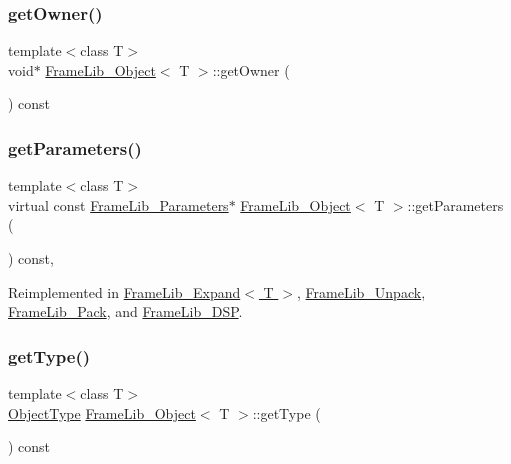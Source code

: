 \subsubsection{\texorpdfstring{get\+Owner()}{getOwner()}}
{\footnotesize\ttfamily template$<$class T$>$ \\
void$\ast$ \hyperlink{class_frame_lib___object}{Frame\+Lib\+\_\+\+Object}$<$ T $>$\+::get\+Owner (\begin{DoxyParamCaption}{ }\end{DoxyParamCaption}) const\hspace{0.3cm}{\ttfamily [inline]}}

\mbox{\label{class_frame_lib___object_ac90a6770aeef26ee1601889dc16dba56}} 
\subsubsection{\texorpdfstring{get\+Parameters()}{getParameters()}}
{\footnotesize\ttfamily template$<$class T$>$ \\
virtual const \hyperlink{class_frame_lib___parameters}{Frame\+Lib\+\_\+\+Parameters}$\ast$ \hyperlink{class_frame_lib___object}{Frame\+Lib\+\_\+\+Object}$<$ T $>$\+::get\+Parameters (\begin{DoxyParamCaption}{ }\end{DoxyParamCaption}) const\hspace{0.3cm}{\ttfamily [inline]}, {\ttfamily [virtual]}}



Reimplemented in \hyperlink{class_frame_lib___expand_ae399eee75f1f0d854505eb67f8fb4dd0}{Frame\+Lib\+\_\+\+Expand$<$ T $>$}, \hyperlink{class_frame_lib___unpack_a10013cfecf3463d8961d65042e735055}{Frame\+Lib\+\_\+\+Unpack}, \hyperlink{class_frame_lib___pack_af3f27c6065dc2e5c8106de50c42d63c3}{Frame\+Lib\+\_\+\+Pack}, and \hyperlink{class_frame_lib___d_s_p_a06325d53b4212e692079b748b82bad86}{Frame\+Lib\+\_\+\+D\+SP}.

\mbox{\label{class_frame_lib___object_a8d96d1f55054e583a99891ad65f84a3a}} 
\subsubsection{\texorpdfstring{get\+Type()}{getType()}}
{\footnotesize\ttfamily template$<$class T$>$ \\
\hyperlink{_frame_lib___types_8h_a842c5e2e69277690b064bf363c017980}{Object\+Type} \hyperlink{class_frame_lib___object}{Frame\+Lib\+\_\+\+Object}$<$ T $>$\+::get\+Type (\begin{DoxyParamCaption}{ }\end{DoxyParamCaption}) const\hspace{0.3cm}{\ttfamily [inline]}}

